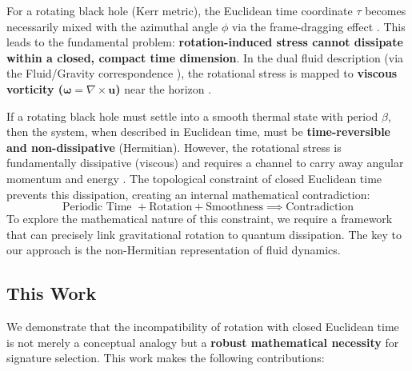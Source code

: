 \documentclass[11pt]{article}
\begin{document}
For a rotating black hole (Kerr metric\cite{Kerr1963}), the Euclidean time coordinate $\tau$ becomes necessarily mixed with the azimuthal angle $\phi$ via the frame-dragging effect \cite{appendix_a1_kerr_expansion.tex}. This leads to the fundamental problem: \textbf{rotation-induced stress cannot dissipate within a closed, compact time dimension}. In the dual fluid description (via the Fluid/Gravity correspondence \cite{FluidGravity2008}), the rotational stress is mapped to \textbf{viscous vorticity ($\mathbf{\omega} = \nabla \times \mathbf{u}$)} near the horizon \cite{appendix_a2_vorticity_calculation.tex}.

If a rotating black hole must settle into a smooth thermal state with period $\beta$, then the system, when described in Euclidean time, must be \textbf{time-reversible and non-dissipative} (Hermitian). However, the rotational stress is fundamentally dissipative (viscous) and requires a channel to carry away angular momentum and energy \cite{Hawking1975}. The topological constraint of closed Euclidean time prevents this dissipation, creating an internal mathematical contradiction:
\[
    \text{Periodic Time } + \text{Rotation} + \text{Smoothness} \implies \text{Contradiction}
\]
To explore the mathematical nature of this constraint, we require a framework that can precisely link gravitational rotation to quantum dissipation. The key to our approach is the non-Hermitian representation of fluid dynamics.

\subsection{This Work}

We demonstrate that the incompatibility of rotation with closed Euclidean time is not merely a conceptual analogy but a \textbf{robust mathematical necessity} for signature selection. This work makes the following contributions:
\end{document}
